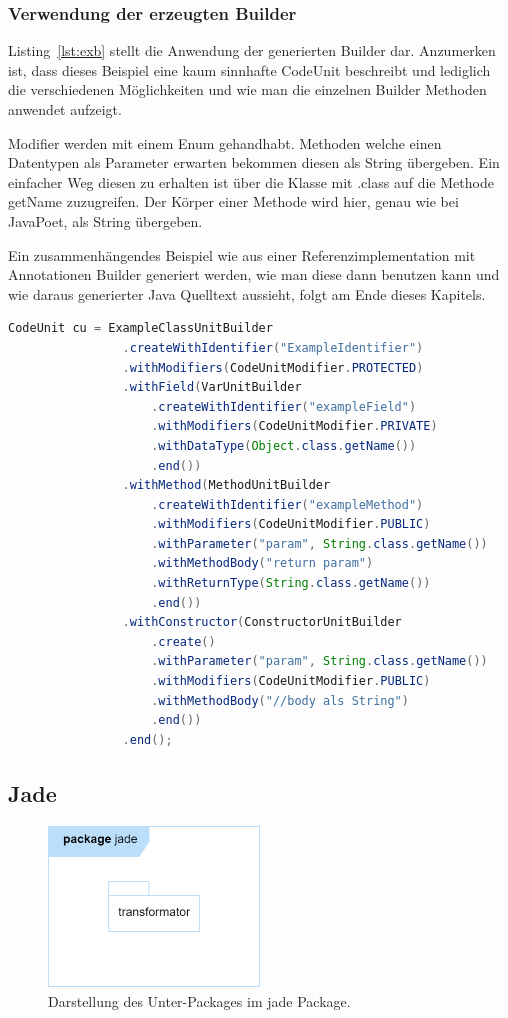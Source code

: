 \documentclass[12pt,oneside,a4paper,parskip]{scrbook}
\begin{document}
\subsubsection{Verwendung der erzeugten Builder}

Listing~\ref{lst:exb} stellt die Anwendung der generierten Builder dar. Anzumerken ist, dass dieses Beispiel eine kaum sinnhafte CodeUnit beschreibt und lediglich die verschiedenen Möglichkeiten und wie man die einzelnen Builder Methoden anwendet aufzeigt.

Modifier werden mit einem Enum gehandhabt. Methoden welche einen Datentypen als Parameter erwarten bekommen diesen als String übergeben. Ein einfacher Weg diesen zu erhalten ist über die Klasse mit .class auf die Methode getName zuzugreifen. Der Körper einer Methode wird hier, genau wie bei JavaPoet, als String übergeben.

Ein zusammenhängendes Beispiel wie aus einer Referenzimplementation mit Annotationen Builder generiert werden, wie man diese dann benutzen kann und wie daraus generierter Java Quelltext aussieht, folgt am Ende dieses Kapitels.

\begin{lstlisting}[label=lst:exb,
language=java,
firstnumber=1,
caption=Quelltext zur Verwendung verschiedener erzeugter Builder.]
CodeUnit cu = ExampleClassUnitBuilder
				.createWithIdentifier("ExampleIdentifier")
				.withModifiers(CodeUnitModifier.PROTECTED)
				.withField(VarUnitBuilder
					.createWithIdentifier("exampleField")
					.withModifiers(CodeUnitModifier.PRIVATE)
					.withDataType(Object.class.getName())
					.end())
				.withMethod(MethodUnitBuilder
					.createWithIdentifier("exampleMethod")
					.withModifiers(CodeUnitModifier.PUBLIC)
					.withParameter("param", String.class.getName())
					.withMethodBody("return param")
					.withReturnType(String.class.getName())
					.end())
				.withConstructor(ConstructorUnitBuilder
					.create()
					.withParameter("param", String.class.getName())
					.withModifiers(CodeUnitModifier.PUBLIC)
					.withMethodBody("//body als String")
					.end())
				.end();
\end{lstlisting}

\subsection{Jade}

\begin{figure}[htbp]
	\centering
	\includegraphics[width=0.5\textwidth]{bilder/jade}
	\caption{Darstellung des Unter-Packages im jade Package.}
	\label{fig:jadePackages}
\end{figure}
\end{document}
